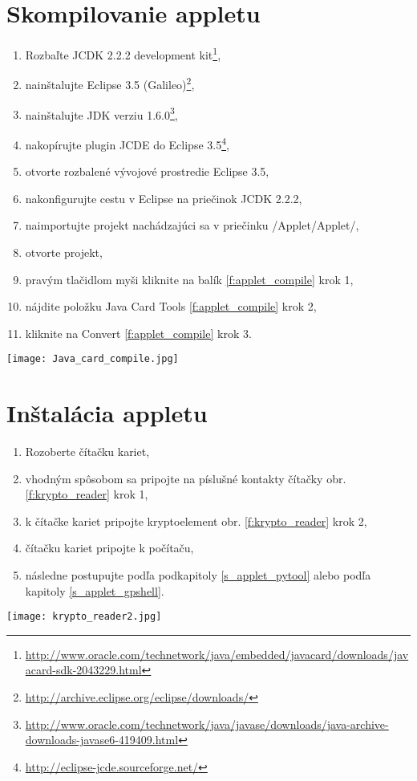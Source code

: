 \documentclass[12pt,a4wide,oneside,openright]{report}
\begin{document}
\section{Skompilovanie appletu} \label{s_applet_compile}
	\begin{enumerate}
		\item Rozbaľte JCDK 2.2.2 development kit\footnote{\url{http://www.oracle.com/technetwork/java/embedded/javacard/downloads/javacard-sdk-2043229.html}},
		\item nainštalujte Eclipse 3.5 (Galileo)\footnote{\url{http://archive.eclipse.org/eclipse/downloads/}},
		\item nainštalujte JDK verziu 1.6.0\footnote{\url{http://www.oracle.com/technetwork/java/javase/downloads/java-archive-downloads-javase6-419409.html}},
		\item nakopírujte plugin JCDE do Eclipse 3.5\footnote{\url{http://eclipse-jcde.sourceforge.net/}},
		\item otvorte rozbalené vývojové prostredie Eclipse 3.5,
		\item nakonfigurujte cestu v Eclipse na priečinok JCDK 2.2.2,
		\item naimportujte projekt nachádzajúci sa v priečinku /Applet/Applet/,
		\item otvorte projekt,
		\item pravým tlačidlom myši kliknite na balík \ref{f:applet_compile} krok 1,
		\item nájdite položku Java Card Tools \ref{f:applet_compile} krok 2,
		\item kliknite na Convert \ref{f:applet_compile} krok 3.
	\end{enumerate}
	
	\begin{figure*}[!htb]
		\centering
		\texttt{[image: Java\_card\_compile.jpg]}
		\caption{Skompilovanie appletu pre kryptoelement.}
		\label{f:applet_compile}
	\end{figure*}
	
 \newpage

\section{Inštalácia appletu} \label{s_applet_install}
	\begin{enumerate}
		\item Rozoberte čítačku kariet, 
		\item vhodným spôsobom sa pripojte na píslušné kontakty čítačky obr.  \ref{f:krypto_reader} krok 1,
		\item k čítačke kariet pripojte kryptoelement obr. \ref{f:krypto_reader} krok 2,
		\item čítačku kariet pripojte k počítaču,
		\item následne postupujte podľa podkapitoly \ref{s_applet_pytool} alebo podľa kapitoly \ref{s_applet_gpshell}.
	\end{enumerate}
	\begin{figure*}[h]
		\centering
		\texttt{[image: krypto\_reader2.jpg]}
		\caption{Pripojenie kryptoelementu k čítačke kariet.}
		\label{f:krypto_reader}
	\end{figure*}
	
\end{document}
